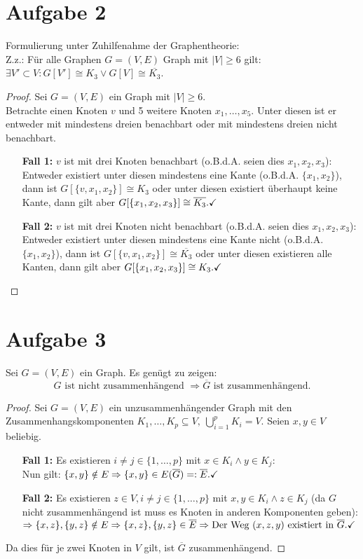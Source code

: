 \documentclass[a4paper,10pt,german]{scrartcl}
\newcommand{\komp}[1]{\ensuremath{\overline{#1}}}
\begin{document}
\section*{Aufgabe 2}
Formulierung unter Zuhilfenahme der Graphentheorie:\\
Z.z.: Für alle Graphen $G=(V,E)$ Graph mit $|V|\geq6$ gilt: $\exists V'\subset V:G[V']\cong K_3\vee G[V]\cong \komp{K_3}$.
\begin{proof}
 Sei $G=(V,E)$ ein Graph mit $|V|\geq6$.\\
 Betrachte einen Knoten $v$ und 5 weitere Knoten $x_1,\dots,x_5$. Unter diesen ist er entweder mit mindestens dreien benachbart oder mit mindestens dreien nicht benachbart.
 \begin{itemize}
  \item[{\bf Fall 1:}]$v$ ist mit drei Knoten benachbart (o.B.d.A. seien dies $x_1,x_2,x_3$):\\
  Entweder existiert unter diesen mindestens eine Kante (o.B.d.A. $\{x_1,x_2\}$), dann ist $G[\{v,x_1,x_2\}]\cong K_3$ oder unter diesen existiert überhaupt keine Kante, 
  dann gilt aber $G[\{x_1,x_2,x_3\}]\cong\komp{K_3}.\hfill \checkmark$
  \item[{\bf Fall 2:}]$v$ ist mit drei Knoten nicht benachbart (o.B.d.A. seien dies $x_1,x_2,x_3$):\\
  Entweder existiert unter diesen mindestens eine Kante nicht (o.B.d.A. $\{x_1,x_2\}$), dann ist $G[\{v,x_1,x_2\}]\cong \komp{K_3}$ oder unter diesen existieren alle Kanten, 
  dann gilt aber $G[\{x_1,x_2,x_3\}]\cong K_3.\hfill \checkmark$
 \end{itemize}
\end{proof}

\section*{Aufgabe 3}
Sei $G=(V,E)$ ein Graph. Es genügt zu zeigen: $$G\text{ ist nicht zusammenhängend }\Rightarrow \komp{G}\text{ ist zusammenhängend.}$$
\begin{proof}
Sei $G=(V,E)$ ein unzusammenhängender Graph mit den Zusammenhangskomponenten $K_1,\dots,K_p\subseteq V,\ \bigcup\limits_{i=1}^pK_i=V$. Seien $x,y\in V$ beliebig.
\begin{itemize}
 \item[{\bf Fall 1:}] Es existieren $i\neq j\in\{1,\dots,p\}$ mit $x\in K_i\wedge y\in K_j$:\\
 Nun gilt: $\{x,y\}\notin E\Rightarrow \{x,y\}\in E(\komp{G})=:\komp{E}.\hfill\checkmark$
 \item[{\bf Fall 2:}]Es existieren $z\in V, i\neq j\in\{1,\dots,p\}$ mit $x,y\in K_i\wedge z\in K_j$ (da $G$ nicht zusammenhängend ist muss es Knoten in anderen Komponenten geben):\\
 $\Rightarrow\{x,z\},\{y,z\}\notin E\Rightarrow \{x,z\},\{y,z\}\in\komp{E}\Rightarrow\text{Der Weg } (x,z,y)\text{ existiert in }\komp{G}.\hfill\checkmark$
\end{itemize}
Da dies für je zwei Knoten in $V$ gilt, ist $\komp{G}$ zusammenhängend. 
\end{proof}
\end{document}

